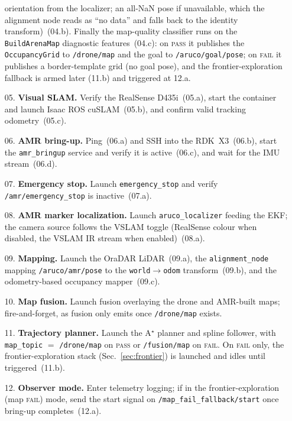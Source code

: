 \documentclass[conference]{IEEEtran}
\newcommand{\subsys}[1]{\texttt{#1}}      %
\begin{document}
\begin{enumerate}
             orientation from the localizer; an all-NaN pose if unavailable, which
             the alignment node reads as ``no data'' and falls back to the
             identity transform)~(04.b). Finally the map-quality classifier runs
             on the \texttt{BuildArenaMap} diagnostic features~(04.c): on
             \textsc{pass} it publishes the \texttt{OccupancyGrid} to
             \texttt{/drone/map} and the goal to \texttt{/aruco/goal/pose}; on
             \textsc{fail} it publishes a border-template grid (no goal pose), and
             the frontier-exploration fallback is armed later (11.b) and triggered
             at 12.a.
  \item[05.] \textbf{Visual SLAM.} Verify the RealSense D435i~(05.a), start the
             container and launch Isaac ROS cuSLAM~(05.b), and confirm valid
             tracking odometry~(05.c).
  \item[06.] \textbf{AMR bring-up.} Ping~(06.a) and SSH into the RDK~X3~(06.b),
             start the \subsys{amr\_bringup} service and verify it is
             active~(06.c), and wait for the IMU stream~(06.d).
  \item[07.] \textbf{Emergency stop.} Launch \subsys{emergency\_stop} and verify
             \texttt{/amr/emergency\_stop} is inactive~(07.a).
  \item[08.] \textbf{AMR marker localization.} Launch \subsys{aruco\_localizer}
             feeding the EKF; the camera source follows the VSLAM toggle
             (RealSense colour when disabled, the VSLAM IR stream when
             enabled)~(08.a).
  \item[09.] \textbf{Mapping.} Launch the OraDAR LiDAR~(09.a), the
             \subsys{alignment\_node} mapping \texttt{/aruco/amr/pose} to the
             \texttt{world}$\to$\texttt{odom} transform~(09.b), and the
             odometry-based occupancy mapper~(09.c).
  \item[10.] \textbf{Map fusion.} Launch fusion overlaying the drone and
             AMR-built maps; fire-and-forget, as fusion only emits once
             \texttt{/drone/map} exists.
  \item[11.] \textbf{Trajectory planner.} Launch the A$^\star$ planner and spline
             follower, with \texttt{map\_topic} $=$ \texttt{/drone/map} on
             \textsc{pass} or \texttt{/fusion/map} on \textsc{fail}. On
             \textsc{fail} only, the frontier-exploration stack
             (Sec.~\ref{sec:frontier}) is launched and idles until
             triggered~(11.b).
  \item[12.] \textbf{Observer mode.} Enter telemetry logging; if in the
             frontier-exploration (map \textsc{fail}) mode, send the start signal
             on \texttt{/map\_fail\_fallback/start} once bring-up
             completes~(12.a).
\end{enumerate}
\end{document}
